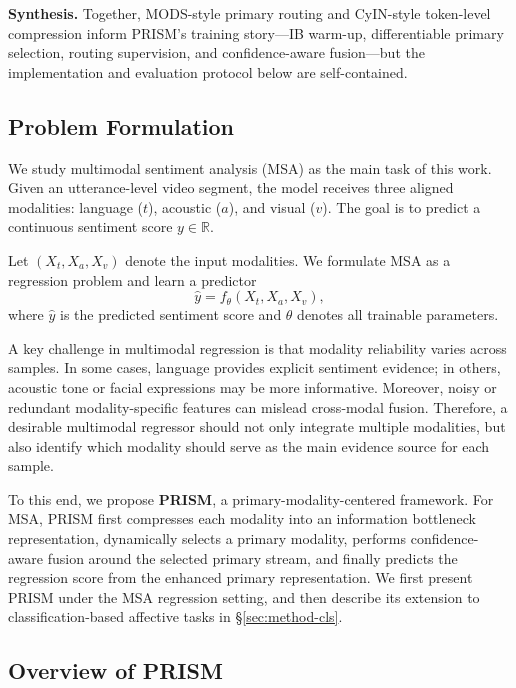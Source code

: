 \documentclass[11pt]{article}
\begin{document}
\textbf{Synthesis.}
Together, MODS-style primary routing and CyIN-style token-level compression
inform PRISM's training story---IB warm-up, differentiable primary selection,
routing supervision, and confidence-aware fusion---but the implementation and
evaluation protocol below are self-contained.

\subsection{Problem Formulation}
\label{sec:method-problem}

We study multimodal sentiment analysis (MSA) as the main task of this work.
Given an utterance-level video segment, the model receives three aligned
modalities: language ($t$), acoustic ($a$), and visual ($v$). The goal is to
predict a continuous sentiment score $y \in \mathbb{R}$.

Let $(X_t, X_a, X_v)$ denote the input modalities. We formulate MSA as a
regression problem and learn a predictor
\begin{equation}
\hat{y} = f_{\theta}(X_t, X_a, X_v),
\end{equation}
where $\hat{y}$ is the predicted sentiment score and $\theta$ denotes all
trainable parameters.

A key challenge in multimodal regression is that modality reliability varies
across samples. In some cases, language provides explicit sentiment evidence;
in others, acoustic tone or facial expressions may be more informative.
Moreover, noisy or redundant modality-specific features can mislead
cross-modal fusion. Therefore, a desirable multimodal regressor should not
only integrate multiple modalities, but also identify which modality should
serve as the main evidence source for each sample.

To this end, we propose \textbf{PRISM}, a primary-modality-centered framework.
For MSA, PRISM first compresses each modality into an information bottleneck
representation, dynamically selects a primary modality, performs
confidence-aware fusion around the selected primary stream, and finally
predicts the regression score from the enhanced primary representation.
We first present PRISM under the MSA regression setting, and then describe its
extension to classification-based affective tasks in
\S\ref{sec:method-cls}.

\subsection{Overview of PRISM}
\label{sec:method-overview}
\end{document}
